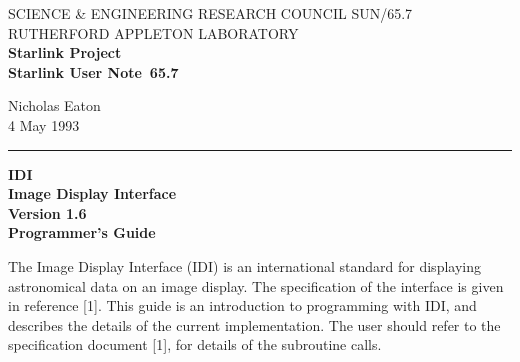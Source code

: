 \pagestyle{myheadings}

\newcommand{\stardoccategory}  {Starlink User Note}
\newcommand{\stardocinitials}  {SUN}
\newcommand{\stardocnumber}    {65.7}
\newcommand{\stardocauthors}   {Nicholas Eaton}
\newcommand{\stardocdate}      {4 May 1993}
\newcommand{\stardoctitle}     {IDI \\[1.0ex]
                                Image Display Interface\\[2.5ex]
                                Version 1.6\\[1.0ex]
                                Programmer's Guide}

\newcommand{\stardocname}{\stardocinitials /\stardocnumber}
\renewcommand{\_}{{\tt\char'137}}     %
\markright{\stardocname}
\setlength{\textwidth}{160mm}
\setlength{\textheight}{230mm}
\setlength{\topmargin}{-2mm}
\setlength{\oddsidemargin}{0mm}
\setlength{\evensidemargin}{0mm}
\setlength{\parindent}{0mm}
\setlength{\parskip}{\medskipamount}
\setlength{\unitlength}{1mm}



\thispagestyle{empty}
SCIENCE \& ENGINEERING RESEARCH COUNCIL \hfill \stardocname\\
RUTHERFORD APPLETON LABORATORY\\
{\large\bf Starlink Project\\}
{\large\bf \stardoccategory\ \stardocnumber}
\begin{flushright}
\stardocauthors\\
\stardocdate
\end{flushright}
\vspace{-4mm}
\rule{\textwidth}{0.5mm}
\vspace{5mm}
\begin{center}
{\Large\bf \stardoctitle}
\end{center}
\vspace{5mm}

The Image Display Interface (IDI) is an international standard for
displaying astronomical data on an image display. The specification of
the interface is given in reference [1]. This guide is an introduction to
programming with IDI, and describes the details of the current implementation.
The user should refer to the specification document [1], for details of the
subroutine calls.

